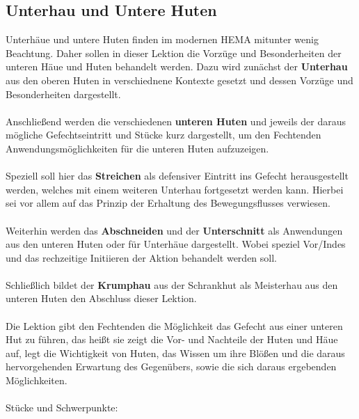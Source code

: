 \newpage 

\begin{center}
\end{center}

\newpage

\subsection{Unterhau und Untere Huten}\label{Unten}

\begin{center}
\end{center}
Unterhäue und untere Huten finden im modernen HEMA mitunter wenig Beachtung. Daher sollen in dieser Lektion die Vorzüge und Besonderheiten der unteren Häue und Huten behandelt werden. Dazu wird zunächst der \textbf{Unterhau} aus den oberen Huten in verschiednene Kontexte gesetzt und dessen Vorzüge und Besonderheiten dargestellt.
\\
\\
Anschließend werden die verschiedenen \textbf{unteren Huten} und jeweils der daraus mögliche Gefechtseintritt und Stücke kurz dargestellt, um den Fechtenden Anwendungsmöglichkeiten für die unteren Huten aufzuzeigen.
\\
\\
Speziell soll hier das \textbf{Streichen} als defensiver Eintritt ins Gefecht herausgestellt werden, welches mit einem weiteren Unterhau fortgesetzt werden kann. Hierbei sei vor allem auf das Prinzip der Erhaltung des Bewegungsflusses verwiesen.
\\
\\
Weiterhin werden das \textbf{Abschneiden} und der \textbf{Unterschnitt} als Anwendungen aus den unteren Huten oder für Unterhäue dargestellt. Wobei speziel Vor/Indes und das rechzeitige Initiieren der Aktion behandelt werden soll.
\\
\\
Schließlich bildet der \textbf{Krumphau} aus der Schrankhut als Meisterhau aus den unteren Huten den Abschluss dieser Lektion.
\\
\\
Die Lektion gibt den Fechtenden die Möglichkeit das Gefecht aus einer unteren Hut zu führen, das heißt sie zeigt die Vor- und Nachteile der Huten und Häue auf, legt die Wichtigkeit von Huten, das Wissen um ihre Blößen und die daraus hervorgehenden Erwartung des Gegenübers, sowie die sich daraus ergebenden Möglichkeiten.
\\
\\
Stücke und Schwerpunkte:

